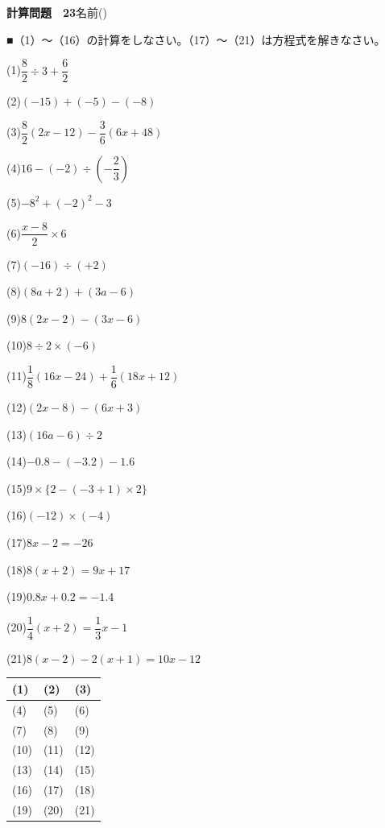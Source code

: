 \documentclass[a4paper,11pt]{ltjsarticle}
\newlength{\qcol}\setlength{\qcol}{0.47\textwidth}
\newlength{\qgap}
\newlength{\anscolw}\setlength{\anscolw}{0.30\textwidth}
\newlength{\ansh}
\newcommand{\Q}[2]{\parbox[t]{\qcol}{\raggedright (#1)\hspace{0.6em}$\displaystyle #2$}}
\newcommand{\QR}[4]{\Q{#1}{#2}\hfill\Q{#3}{#4}\par\vspace{\qgap}}
\newcommand{\anscell}[1]{\rule[-\ansdrop]{0pt}{\ansh}(#1)}
\newlength{\ansdrop}
\begin{document}
{\large\bfseries 計算問題　23}\hfill 名前(\underline{\hspace{32mm}})\par\vspace{3mm}
■（1）〜（16）の計算をしなさい。（17）〜（21）は方程式を解きなさい。\par\vspace{3mm}
\setlength{\qgap}{5.4mm}
\QR{1}{\dfrac{8}{2}\div3+\dfrac{6}{2}}{2}{(-15)+(-5)-(-8)}
\QR{3}{\dfrac{8}{2}(2x-12)-\dfrac{3}{6}(6x+48)}{4}{16-(-2)\div\left(-\dfrac{2}{3}\right)}
\QR{5}{-8^2+(-2)^2-3}{6}{\dfrac{x-8}{2}\times6}
\QR{7}{(-16)\div(+2)}{8}{(8a+2)+(3a-6)}
\QR{9}{8(2x-2)-(3x-6)}{10}{8\div2\times(-6)}
\QR{11}{\dfrac{1}{8}(16x-24)+\dfrac{1}{6}(18x+12)}{12}{(2x-8)-(6x+3)}
\QR{13}{(16a-6)\div2}{14}{-0.8-(-3.2)-1.6}
\QR{15}{9\times\{2-(-3+1)\times2\}}{16}{(-12)\times(-4)}
\QR{17}{8x-2=-26}{18}{8(x+2)=9x+17}
\QR{19}{0.8x+0.2=-1.4}{20}{\dfrac{1}{4}(x+2)=\dfrac{1}{3}x-1}
\vspace{1mm}
\Q{21}{8(x-2)-2(x+1)=10x-12}\par\vspace{3mm}
\setlength{\ansh}{9.5mm}\setlength{\ansdrop}{6mm}%
\begin{center}\begin{tabular}{|p{\anscolw}|p{\anscolw}|p{\anscolw}|}\hline
\anscell{1} & \anscell{2} & \anscell{3} \\\hline
\anscell{4} & \anscell{5} & \anscell{6} \\\hline
\anscell{7} & \anscell{8} & \anscell{9} \\\hline
\anscell{10} & \anscell{11} & \anscell{12} \\\hline
\anscell{13} & \anscell{14} & \anscell{15} \\\hline
\anscell{16} & \anscell{17} & \anscell{18} \\\hline
\anscell{19} & \anscell{20} & \anscell{21} \\\hline
\end{tabular}\end{center}
\end{document}
